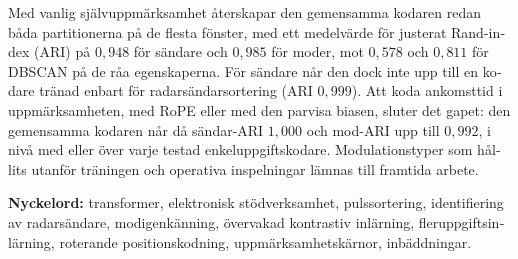 \begin{otherlanguage}{swedish}
Med vanlig självuppmärksamhet återskapar den gemensamma kodaren redan båda partitionerna på de flesta fönster, med ett medelvärde för justerat Rand-index (ARI) på $0{,}948$ för sändare och $0{,}985$ för moder, mot $0{,}578$ och $0{,}811$ för DBSCAN på de råa egenskaperna.
För sändare når den dock inte upp till en kodare tränad enbart för radarsändarsortering (ARI $0{,}999$).
Att koda ankomsttid i uppmärksamheten, med RoPE eller med den parvisa biasen, sluter det gapet: den gemensamma kodaren når då sändar-ARI $1{,}000$ och mod-ARI upp till $0{,}992$, i nivå med eller över varje testad enkeluppgiftskodare.
Modulationstyper som hållits utanför träningen och operativa inspelningar lämnas till framtida arbete.

\vspace{1em}
\noindent\textbf{Nyckelord:} transformer, elektronisk stödverksamhet, pulssortering, identifiering av radarsändare, modigenkänning, övervakad kontrastiv inlärning, fleruppgiftsinlärning, roterande positionskodning, uppmärksamhetskärnor, inbäddningar.
\end{otherlanguage}
